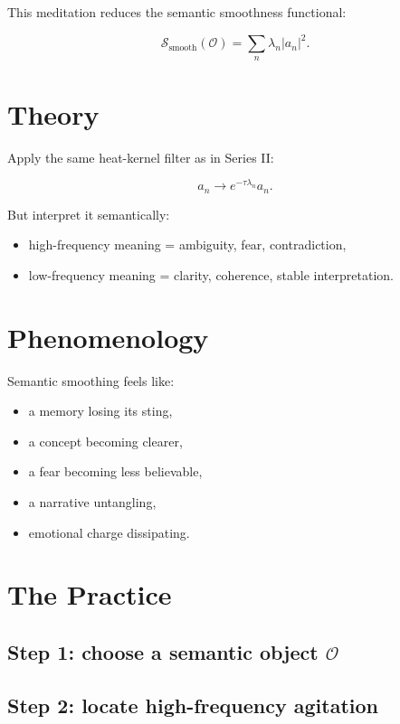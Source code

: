\documentclass[12pt]{article}
\begin{document}
This meditation reduces the semantic smoothness functional:

\[
\mathcal{S}_{\mathrm{smooth}}(\mathcal{O})
    = \sum_n \lambda_n |a_n|^2.
\]

\section{Theory}

Apply the same heat-kernel filter as in Series II:

\[
a_n \to e^{-\tau\lambda_n} a_n.
\]

But interpret it semantically:

\begin{itemize}
\item high-frequency meaning = ambiguity, fear, contradiction,
\item low-frequency meaning = clarity, coherence, stable interpretation.
\end{itemize}


\section{Phenomenology}

Semantic smoothing feels like:

\begin{itemize}
    \item a memory losing its sting,
    \item a concept becoming clearer,
    \item a fear becoming less believable,
    \item a narrative untangling,
    \item emotional charge dissipating.
\end{itemize}

\section{The Practice}

\subsection*{Step 1: choose a semantic object $\mathcal{O}$}

\subsection*{Step 2: locate high-frequency agitation}
\end{document}
